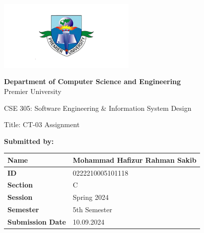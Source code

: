 \documentclass{scrreprt}
\renewcommand{\arraystretch}{1.5} %
\begin{document}
\begin{titlepage}
    \centering
    \includegraphics[width=0.5\textwidth]{logo.png} %
    \vspace{1cm}

    \textbf{Department of Computer Science and Engineering}\\
    Premier University
    \vspace{1cm}

    \huge \textnormal{CSE 305: Software Engineering \& Information System Design}
    \vspace{1in} %

    \Large \textnormal{Title: CT-03 Assignment}
    \vspace{0.5in} %

    \large
    \textbf{Submitted by:}
    \vspace{0.5cm}

    \renewcommand{\arraystretch}{1.5} %
    \begin{tabular}{|p{}|p{}|} %
        \hline
        \textbf{Name} & Mohammad Hafizur Rahman Sakib \\
        \hline
        \textbf{ID} & 0222210005101118 \\
        \hline
        \textbf{Section} & C \\
        \hline
        \textbf{Session} & Spring 2024 \\
        \hline
        \textbf{Semester} & 5th Semester \\
        \hline
        \textbf{Submission Date} & 10.09.2024 \\
        \hline
    \end{tabular}
    \vspace{1cm}


\end{titlepage}
\end{document}
